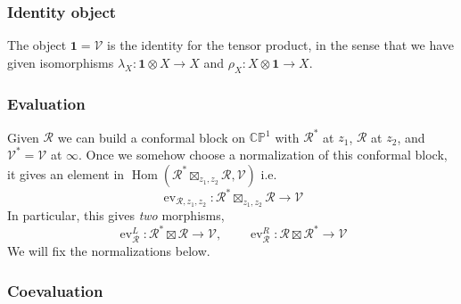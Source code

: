 \documentclass[12pt,letterpaper,reqno]{amsart}
\numberwithin{equation}{section}
\newcommand{\bbR}{\ensuremath{\mathbb R}}
\newcommand{\bbC}{\ensuremath{\mathbb C}}
\newcommand{\bbP}{\ensuremath{\mathbb P}}
\newcommand{\I}{{\mathrm i}}
\newcommand\bid{{\mathbf 1}}
\newcommand{\vertex}{\mathcal{V}}
\newcommand{\vrep}{\mathcal{R}}
\newcommand{\ti}[1]{\textit{#1}}
\DeclareMathOperator{\Hom}{Hom}
\DeclareMathOperator{\ev}{ev}
\begin{document}
\subsubsection{Identity object}

The object $\bid = \vertex$ is the identity for the tensor product,
in the sense that we have given isomorphisms 
$\lambda_X: \bid \otimes X\to X$ and $\rho_X:X\otimes \bid \to X$.

\subsubsection{Evaluation}


Given $\vrep$ we can build a conformal block 
on $\bbC \bbP^1$ with $\vrep^*$ at $z_1$, $\vrep$ at $z_2$,
and $\vertex^* = \vertex$ at $\infty$.
Once we somehow choose a normalization of this conformal block,
it gives an element in $\Hom(\vrep^* \boxtimes_{z_1,z_2} \vrep, \vertex)$ i.e.
\begin{equation}
  \ev_{\vrep,z_1,z_2}: \vrep^* \boxtimes_{z_1,z_2} \vrep \to \vertex
\end{equation}
In particular, this gives \ti{two} morphisms,
\begin{equation}
  \ev^L_\vrep: \vrep^* \boxtimes \vrep \to \vertex, \qquad   \ev^R_\vrep: \vrep \boxtimes \vrep^* \to \vertex
\end{equation}
We will fix the normalizations below.




\subsubsection{Coevaluation}
\end{document}
